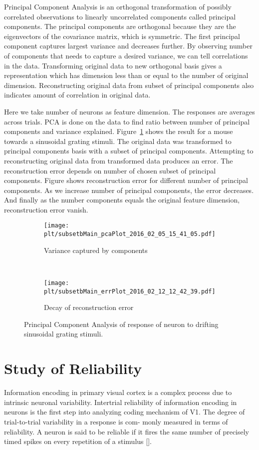 \documentclass[MTech]{iitmdiss}
\newcommand{\plt}{thesis_plots}
\begin{document}
Principal Component Analysis is an orthogonal transformation of possibly correlated observations to linearly uncorrelated components called principal components.  The principal components are orthogonal because they are the eigenvectors of the covariance matrix, which is symmetric. The first principal component captures largest variance and decreases further. By observing number of components that needs to capture a desired variance, we can tell correlations in the data. Transforming original data to new orthogonal basis gives a representation which has dimension less than or equal to the number of original dimension. Reconstructing original data from subset of principal components also indicates amount of correlation in original data.

Here we take number of neurons as feature dimension. The responses are averages across trials.  PCA is done on the data to find ratio between number of principal components and variance explained. Figure~\ref{img:pca} shows the result for a mouse towards a sinusoidal grating stimuli. The original data was transformed to principal components basis with a subset of principal components. Attempting to reconstructing original data from transformed data produces an error. The reconstruction error depends on number of chosen subset of principal components. Figure shows reconstruction error for different number of principal components. As we increase number of principal components, the error decreases. And finally as the number components equals the original feature dimension, reconstruction error vanish.

\begin{figure}
    \centering
    \begin{subfigure}[b]{.48\textwidth}
        \centering
        \texttt{[image: \\plt/subsetbMain\_pcaPlot\_2016\_02\_05\_15\_41\_05.pdf]}
        \caption{Variance captured by components}
        \label{img:pca}
    \end{subfigure}
    ~
    \begin{subfigure}[b]{.48\textwidth}
        \centering
        \texttt{[image: \\plt/subsetbMain\_errPlot\_2016\_02\_12\_12\_42\_39.pdf]}
        \caption{Decay of reconstruction error}
        \label{img:reconstruction}
    \end{subfigure}
    \caption{Principal Component Analysis of response of neuron to drifting sinusoidal grating stimuli.}
\end{figure}

\section{Study of Reliability} %
\label{sec:study_of_reliability}
Information encoding in primary visual cortex is a complex process due to intrinsic neuronal variability. Intertrial reliability of information encoding in neurons is the first step into analyzing coding mechanism of V1. The degree of trial-to-trial variability in a response is com-
monly measured in terms of reliability. A neuron is said to be reliable if it fires the same number of precisely timed spikes on every repetition of a stimulus [\cite{tiesinga2008regulation}].
\end{document}
